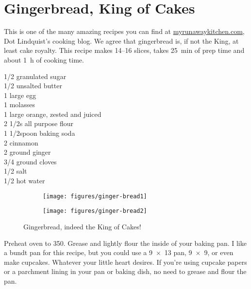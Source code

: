 \section{Gingerbread, King of Cakes}

\begin{open}
    This is one of the many amazing recipes you can find at
    \url{myrunawaykitchen.com}, Dot Lindquist's cooking blog.  We agree that
    gingerbread is, if not the King, at least cake royalty.  This recipe makes
    \numrange{14}{16} slices, takes \SI{25}{\minute} of prep time and about
    \SI{1}{\hour} of cooking time.
\end{open}
\begin{ingredients}
    \SI{1/2}{\cup}  granulated sugar\\
    \SI{1/2}{\cup}  unsalted butter\\
    1 large egg\\
    \SI{1}{\cup} molasses\\
    1 large orange, zested and juiced\\
    2 \SI{1/2}{\cup}s  all purpose flour\\
    1 \SI{1/2}{\cup}spoon  baking soda\\
    \SI{2}{\teaspoon} cinnamon\\
    \SI{2}{\teaspoon} ground ginger\\
    \SI{3/4}{\teaspoon}   ground cloves\\
    \SI{1/2}{\teaspoon}  salt\\
    \SI{1/2}{\cup}  hot water\\
\end{ingredients}
\begin{figure}
    \centering
    \begin{subfigure}{0.6\textwidth}
        \centering
        \texttt{[image: figures/ginger-bread1]}
    \end{subfigure}
    \begin{subfigure}{0.34\textwidth}
        \centering
        \texttt{[image: figures/ginger-bread2]}
    \end{subfigure}
    \caption*{Gingerbread, indeed the King of Cakes!}
\end{figure}
Preheat oven to \SI{350}{\degreeF}. Grease and lightly flour the inside of your
baking pan. I like a bundt pan for this recipe, but you could use a
\SI{9x13}{\inch} pan, \SI{9x9}{\inch}, or even make cupcakes. Whatever your
little heart desires. If you're using cupcake papers or a parchment lining in
your pan or baking dish, no need to grease and flour the pan.

